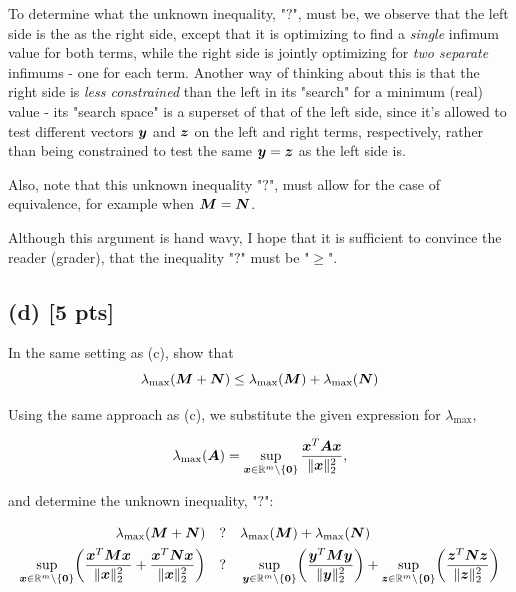 \documentclass[twoside,10pt]{article}
\newcommand{\q}{\quad?\quad}
\begin{document}
To determine what the unknown inequality, "$?$", must be, we observe that the left side is the  as the right side, except that it is optimizing to find a \textit{single} infimum value for both terms, while the right side is jointly optimizing for \textit{two separate} infimums - one for each term.
Another way of thinking about this is that the right side is \textit{less constrained} than the left in its "search" for a minimum (real) value - its "search space" is a superset of that of the left side, since it's allowed to test different vectors $\bm{y}$ and $\bm{z}$ on the left and right terms, respectively, rather than being constrained to test the same $\bm{y} = \bm{z}$ as the left side is.

Also, note that this unknown inequality "$?$", must allow for the case of equivalence, for example when $\bm{M} = \bm{N}$.

Although this argument is hand wavy, I hope that it is sufficient to convince the reader (grader), that the inequality "$?$" must be "$\geq$".

\subsection*{(d) [5 pts]}
In the same setting as (c), show that 
\begin{equation}
  \lambda_{\mathrm{max}}(\mtx{M} + \mtx{N}) \leq \lambda_{\mathrm{max}}\left(\mtx{M}\right) + \lambda_{\mathrm{max}}\left(\mtx{N}\right)
\end{equation}

Using the same approach as (c), we substitute the given expression for $\lambda_{\mathrm{max}}$,

\begin{equation*}
   \lambda_{\mathrm{max}}\left(\mtx{A}\right) = \sup \limits_{\vct{x} \in \R^m \setminus \{\vct{0}\}} \frac{\vct{x}^T \mtx{A}\vct{x}}{\|\vct{x}\|_2^2},
\end{equation*}

and determine the unknown inequality, "$?$":

\begin{align*}
  \lambda_{\mathrm{max}}(\mtx{M} + \mtx{N}) &\q \lambda_{\mathrm{max}}\left(\mtx{M}\right) + \lambda_{\mathrm{max}}\left(\mtx{N}\right)\\
  \sup \limits_{\vct{x} \in \R^m \setminus \{\vct{0}\}} \left(\dfrac{\vct{x}^T \mtx{M}\vct{x} }{\|\vct{x}\|_2^2} + \dfrac{\vct{x}^T\mtx{N}\vct{x}}{\|\vct{x}\|_2^2}\right) &\q  \sup \limits_{\vct{y} \in \R^m \setminus \{\vct{0}\}} \left(\dfrac{\vct{y}^T \mtx{M}\vct{y}}{\|\vct{y}\|_2^2}\right) + \sup \limits_{\vct{z} \in \R^m \setminus \{\vct{0}\}} \left(\dfrac{\vct{z}^T \mtx{N}\vct{z}}{\|\vct{z}\|_2^2}\right)\\
\end{align*}
\end{document}
